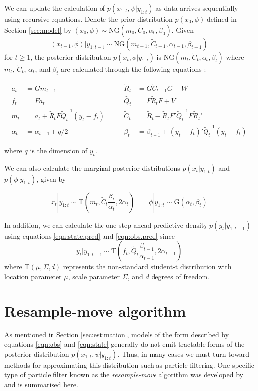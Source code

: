 \documentclass{article}
\begin{document}
We can update the calculation of $p(x_{1:t},\psi|y_{1:t})$ as data arrives sequentially using recursive equations. Denote the prior distribution $p(x_0, \phi)$ defined in Section \ref{sec:model} by $(x_0, \phi) \sim \mbox{NG}(m_0, \tilde{C}_0, \alpha_0, \beta_0)$. Given \[(x_{t-1},\phi)|y_{1:t-1} \sim \mbox{NG}(m_{t-1},\tilde{C}_{t-1}, \alpha_{t-1}, \beta_{t-1})\]
\noindent for $t \ge 1$, the posterior distribution $p(x_t,\phi|y_{1:t})$ is $\mbox{NG}(m_t,\tilde{C}_t,\alpha_t,\beta_t)$ where $m_t$, $\tilde{C}_t$, $\alpha_t$, and $\beta_t$ are calculated through the following equations \citep{petris2009dynamic}:

\begin{align}
a_t &= Gm_{t-1} &\qquad \tilde{R}_t &= G\tilde{C}_{t-1}G + W \label{eqn:state.pred} \\
f_t &= Fa_t &\qquad \tilde{Q_t} &= F\tilde{R}_tF + V \label{eqn:obs.pred} \\
m_t &= a_t + \tilde{R}_tF\tilde{Q}_t^{-1}(y_t-f_t) &\qquad \tilde{C}_t &= \tilde{R}_t - \tilde{R}_tF'\tilde{Q}_t^{-1}F\tilde{R}_t' \\
\alpha_t &= \alpha_{t-1} + q / 2 &\qquad \beta_t &= \beta_{t-1} + (y_t-f_t)'\tilde{Q}_t^{-1}(y_t-f_t)
\end{align}

\noindent where $q$ is the dimension of $y_t$.

We can also calculate the marginal posterior distributions $p(x_t|y_{1:t})$ and $p(\phi|y_{1:t})$, given by

\begin{equation}
x_t|y_{1:t} \sim \mbox{T}(m_t,\tilde{C}_t \frac{\beta_t}{\alpha_t},2\alpha_t) \qquad \phi|y_{1:t} \sim \mbox{G}(\alpha_t,\beta_t) \label{eqn:margpost}
\end{equation}

In addition, we can calculate the one-step ahead predictive density $p(y_t|y_{1:t-1})$ using equations \eqref{eqn:state.pred} and \eqref{eqn:obs.pred} since \[y_t|y_{1:t-1} \sim \mbox{T}(f_t,\tilde{Q}_t \frac{\beta_{t-1}}{\alpha_{t-1}},2\alpha_{t-1})\]
\noindent where $\mbox{T}(\mu,\Sigma,d)$ represents the non-standard student-t distribution with location parameter $\mu$, scale parameter $\Sigma$, and $d$ degrees of freedom.

\section{Resample-move algorithm} \label{sec:rm}

As mentioned in Section \ref{sec:estimation}, models of the form described by equations \eqref{eqn:obs} and \eqref{eqn:state} generally do not emit tractable forms of the posterior distribution $p(x_{1:t},\psi|y_{1:t})$. Thus, in many cases we must turn toward methods for approximating this distribution such as particle filtering. One specific type of particle filter known as the \emph{resample-move} algorithm was developed by \citet{Gilk:Berz:foll:2001, Berz:gilk:2001} and is summarized here.
\end{document}
